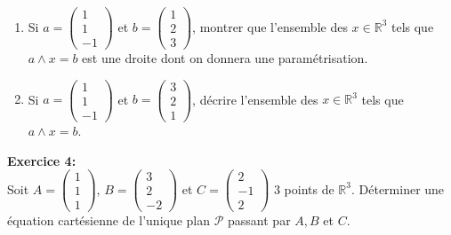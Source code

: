 \documentclass{article}
\newcommand{\R}{\mathbb{R}}
\begin{document}
\begin{enumerate}


\item
Si 
$a= \begin{pmatrix} 
     1 \\ 1 \\ -1
    \end{pmatrix}$
 et $b= \begin{pmatrix} 1 \\ 2 \\ 3 \end{pmatrix}$, montrer que l'ensemble des $x\in \mathbb{R}^3$ tels que $a\wedge x = b$ est une droite dont on donnera une paramétrisation.
\item
Si $a=\begin{pmatrix}
       1 \\ 1 \\-1
      \end{pmatrix} $ 
et $b= \begin{pmatrix} 3 \\2 \\ 1 \end{pmatrix} $, décrire l'ensemble des $x\in \mathbb{R}^3$ tels que $a\wedge x =b$.
\end{enumerate}

\medskip
\noindent
\textbf{Exercice 4:}\\
Soit 
$A=\begin{pmatrix}
1 \\1 \\1
\end{pmatrix}$, 
$B=\begin{pmatrix}
 3\\ 2\\ -2
\end{pmatrix}$
et 
$C=\begin{pmatrix}
 2\\ -1 \\ 2
\end{pmatrix}$ 3 points de $\R^3$.
Déterminer une équation cartésienne de l'unique plan $\mathcal{P}$ passant par $A,B$ et $C$.
\end{document}
